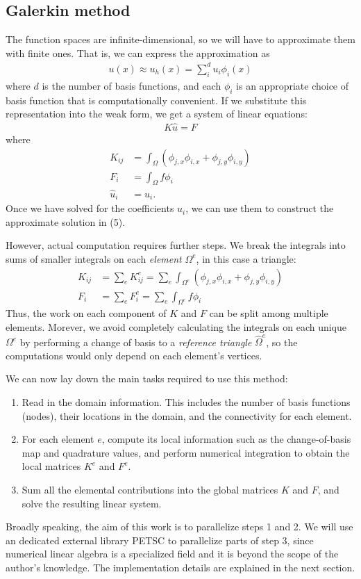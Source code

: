\documentclass[12pt]{extreport}
\begin{document}
\subsection*{Galerkin method}
The function spaces are infinite-dimensional, so we will have to approximate them with finite ones. That is, we can express the approximation as
\begin{align}
  u(x) \approx u_h(x) = \sum_i^d u_i \phi_i(x)
\end{align}
where $d$ is the number of basis functions, and each $\phi_i$ is an appropriate choice of basis function that is computationally convenient. If we substitute this representation into the weak form, we get a system of linear equations:
\begin{align}
  K\hat{u} = F
\end{align}
where
\begin{align}
  K_{ij} &= \int_\Omega (\phi_{j,x} \phi_{i,x} + \phi_{j,y} \phi_{i,y}) \\
  F_i &= \int_\Omega f \phi_i \\
  \hat{u}_i &= u_i.
\end{align}
Once we have solved for the coefficients $u_i$, we can use them to construct the approximate solution in (5).

However, actual computation requires further steps. We break the integrals into sums of smaller integrals on each \textit{element} $\Omega^e$, in this case a triangle:
\begin{align}
  K_{ij} &= \sum_e K^e_{ij} = \sum_e \int_{\Omega^e} (\phi_{j,x} \phi_{i,x} + \phi_{j,y} \phi_{i,y}) \\
  F_i &= \sum_e F^e_i = \sum_e \int_{\Omega^e} f \phi_i
\end{align}
Thus, the work on each component of $K$ and $F$ can be split among multiple elements. Morever, we avoid completely calculating the integrals on each unique $\Omega^e$ by performing a change of basis to a \textit{reference triangle} $\hat{\Omega}^e$, so the computations would only depend on each element's vertices.

We can now lay down the main tasks required to use this method:
\begin{enumerate}
\item Read in the domain information. This includes the number of basis functions (nodes), their locations in the domain, and the connectivity for each element.
\item For each element $e$, compute its local information such as the change-of-basis map and quadrature values, and perform numerical integration to obtain the local matrices $K^e$ and $F^e$.
\item Sum all the elemental contributions into the global matrices $K$ and $F$, and solve the resulting linear system.
\end{enumerate}
Broadly speaking, the aim of this work is to parallelize steps 1 and 2. We will use an dedicated external library PETSC to parallelize parts of step 3, since numerical linear algebra is a specialized field and it is beyond the scope of the author's knowledge. The implementation details are explained in the next section.
\end{document}
